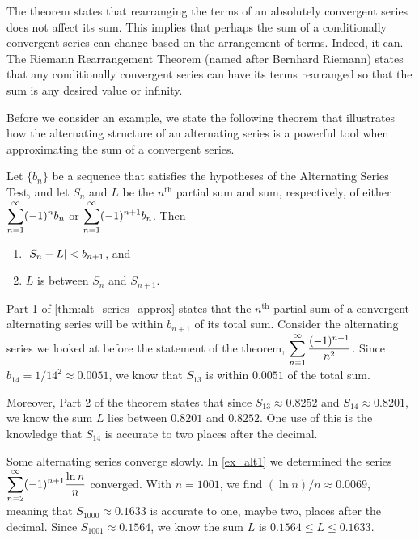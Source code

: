 The theorem states that rearranging the terms of an absolutely convergent series does not affect its sum. This implies that perhaps the sum of a conditionally convergent series can change based on the arrangement of terms. Indeed, it can. The Riemann Rearrangement Theorem (named after Bernhard Riemann) states that any conditionally convergent series can have its terms rearranged so that the sum is any desired value or infinity.

Before we consider an example, we state the following theorem that illustrates how the alternating structure of an alternating series is a powerful tool when approximating the sum of a convergent series.

\begin{theorem}\label{thm:alt_series_approx}%
Let $\{b_n\}$ be a sequence that satisfies the hypotheses of the Alternating Series Test, and let $S_n$ and $L$ be the $n^{\text{th}}$ partial sum and sum, respectively, of either $\displaystyle \sum_{n=1}^\infty (-1)^{n}b_n$ or $\displaystyle \sum_{n=1}^\infty (-1)^{n+1}b_n$. Then
\begin{enumerate}
	\item $\left\lvert S_n-L \right\rvert < b_{n+1}$, and
	\item	$L$ is between $S_n$ and $S_{n+1}$.
\end{enumerate}
\end{theorem}

Part 1 of \autoref{thm:alt_series_approx} states that the $n^{\text{th}}$ partial sum of a convergent alternating series will be within $b_{n+1}$ of its total sum. Consider the alternating series we looked at before the statement of the theorem, $\displaystyle \sum_{n=1}^\infty \frac{(-1)^{n+1}}{n^2}$. Since $b_{14} = 1/14^2 \approx 0.0051$, we know that $S_{13}$ is within $0.0051$ of the total sum. 

Moreover, Part 2 of the theorem states that since $S_{13} \approx 0.8252$ and $S_{14}\approx 0.8201$, we know the sum $L$ lies between $0.8201$ and $0.8252$. One use of this is the knowledge that $S_{14}$ is accurate to two places after the decimal.

Some alternating series converge slowly. In \autoref{ex_alt1} we determined the series $\displaystyle\sum_{n=2}^\infty (-1)^{n+1}\frac{\ln n}{n}$ converged. With $n=1001$, we find $(\ln n)/n \approx 0.0069$, meaning that $S_{1000} \approx 0.1633$ is accurate to one, maybe two, places after the decimal. Since $S_{1001} \approx 0.1564$, we know the sum $L$ is $0.1564\leq L\leq0.1633$.

